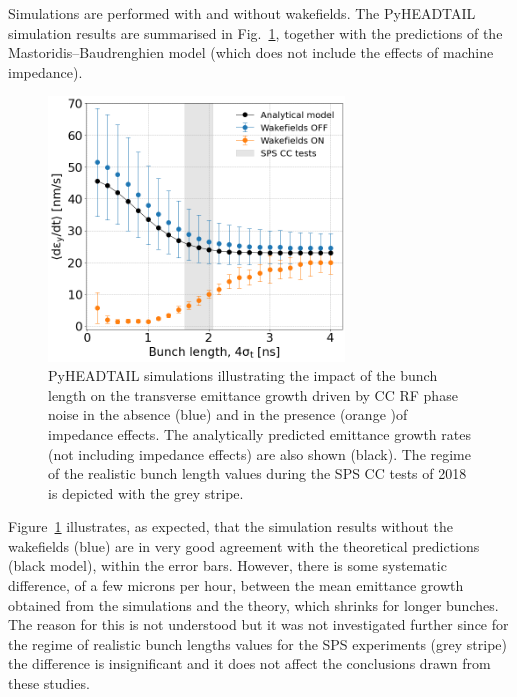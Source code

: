 Simulations are performed with and without wakefields. The PyHEADTAIL simulation results are summarised in Fig.~\ref{fig:study_10_bunch_length}, together with the predictions of the Mastoridis--Baudrenghien model (which does not include the effects of machine impedance).

\begin{figure}[!h] %
    \centering         
    \includegraphics[width=0.7\textwidth]{images/Ch7/deyRates_sps_PN1e-8_00MHz_270GeV_wakesOFF_vs_ON_QpxQpy5e-1_Nb5e5_ayy2000_slices500_intensity3e10_sigmaScanScanZvsTheorywithoutWakes_vs_SPS_sigmaz_ignore_first_point.png}
        \caption{PyHEADTAIL simulations illustrating the impact of the bunch length on the transverse emittance growth driven by CC RF phase noise in the absence (blue) and in the presence (orange )of impedance effects. The analytically predicted emittance growth rates (not including impedance effects) are also shown (black). The regime of the realistic bunch length values during the SPS CC tests of 2018 is depicted with the grey stripe.}
        \label{fig:study_10_bunch_length}
 \end{figure}

 Figure~\ref{fig:study_10_bunch_length} illustrates, as expected, that the simulation results without the wakefields (blue) are in very good agreement with the theoretical predictions (black model), within the error bars. However, there is some systematic difference, of a few microns per hour, between the mean emittance growth obtained from the simulations and the theory, which shrinks for longer bunches. The reason for this is not understood but it was not investigated further since for the regime of realistic bunch lengths values for the SPS experiments (grey stripe) the difference is insignificant and it does not affect the conclusions drawn from these studies.
 
